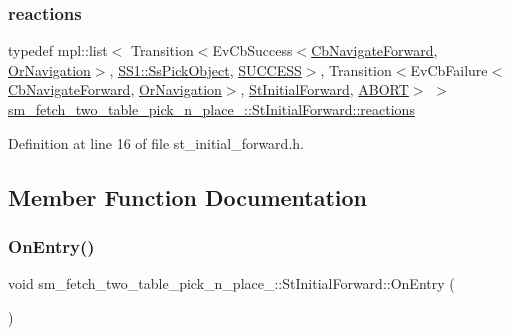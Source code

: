 \subsubsection{\texorpdfstring{reactions}{reactions}}
{\footnotesize\ttfamily typedef mpl\+::list$<$ Transition$<$Ev\+Cb\+Success$<$\hyperlink{classcl__move__base__z_1_1CbNavigateForward}{Cb\+Navigate\+Forward}, \hyperlink{classsm__fetch__two__table__pick__n__place__1_1_1OrNavigation}{Or\+Navigation}$>$, \hyperlink{structsm__fetch__two__table__pick__n__place__1_1_1SS1_1_1SsPickObject}{S\+S1\+::\+Ss\+Pick\+Object}, \hyperlink{classSUCCESS}{S\+U\+C\+C\+E\+SS}$>$, Transition$<$Ev\+Cb\+Failure$<$\hyperlink{classcl__move__base__z_1_1CbNavigateForward}{Cb\+Navigate\+Forward}, \hyperlink{classsm__fetch__two__table__pick__n__place__1_1_1OrNavigation}{Or\+Navigation}$>$, \hyperlink{structsm__fetch__two__table__pick__n__place__1_1_1StInitialForward}{St\+Initial\+Forward}, \hyperlink{classABORT}{A\+B\+O\+RT}$>$ $>$ \hyperlink{structsm__fetch__two__table__pick__n__place__1_1_1StInitialForward_ac3cdc1af3fb1641169c5e7367ebed93b}{sm\+\_\+fetch\+\_\+two\+\_\+table\+\_\+pick\+\_\+n\+\_\+place\+\_\+::\+St\+Initial\+Forward\+::reactions}}



Definition at line 16 of file st\+\_\+initial\+\_\+forward.\+h.



\subsection{Member Function Documentation}
\mbox{\label{structsm__fetch__two__table__pick__n__place__1_1_1StInitialForward_ad399e67494196c702c6e241f688a19f2}} 
\subsubsection{\texorpdfstring{On\+Entry()}{OnEntry()}}
{\footnotesize\ttfamily void sm\+\_\+fetch\+\_\+two\+\_\+table\+\_\+pick\+\_\+n\+\_\+place\+\_\+::\+St\+Initial\+Forward\+::\+On\+Entry (\begin{DoxyParamCaption}{ }\end{DoxyParamCaption})\hspace{0.3cm}{\ttfamily [inline]}}



